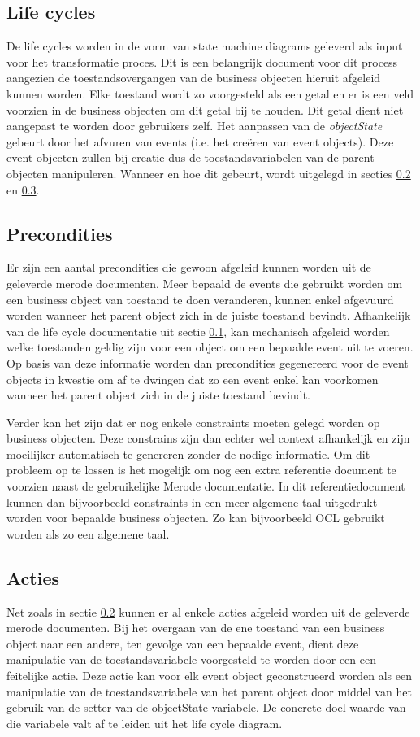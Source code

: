 \subsection{Life cycles}
\label{sec:Life_cycles}
De life cycles worden in de vorm van state machine diagrams geleverd als input voor het transformatie proces. 
Dit is een belangrijk document voor dit process aangezien de toestandsovergangen van de business objecten hieruit afgeleid kunnen worden.
Elke toestand wordt zo voorgesteld als een getal en er is een veld voorzien in de business objecten om dit getal bij te houden. 
Dit getal dient niet aangepast te worden door gebruikers zelf. Het aanpassen van de \textit{objectState} gebeurt door het afvuren van events (i.e. het cre\"eren van event objects). 
Deze event objecten zullen bij creatie dus de toestandsvariabelen van de parent objecten manipuleren.
Wanneer en hoe dit gebeurt, wordt uitgelegd in secties \ref{sec:precondities} en \ref{sec:acties}.
\subsection{Precondities}
\label{sec:precondities}
Er zijn een aantal precondities die gewoon afgeleid kunnen worden uit de geleverde merode documenten.
Meer bepaald de events die gebruikt worden om een business object van toestand te doen veranderen, kunnen enkel afgevuurd worden wanneer het parent object zich in de juiste toestand bevindt. 
Afhankelijk van de life cycle documentatie uit sectie \ref{sec:Life_cycles}, kan mechanisch afgeleid worden welke toestanden geldig zijn voor een object om een bepaalde event uit te voeren.
Op basis van deze informatie worden dan precondities gegenereerd voor de event objects in kwestie om af te dwingen dat zo een event enkel kan voorkomen wanneer het parent object zich in de juiste toestand bevindt. 

Verder kan het zijn dat er nog enkele constraints moeten gelegd worden op business objecten. Deze constrains zijn dan echter wel context afhankelijk en zijn moeilijker automatisch te genereren zonder de nodige informatie.
Om dit probleem op te lossen is het mogelijk om nog een extra referentie document te voorzien naast de gebruikelijke Merode documentatie.
In dit referentiedocument kunnen dan bijvoorbeeld constraints in een meer algemene taal uitgedrukt worden voor bepaalde business objecten. Zo kan bijvoorbeeld OCL gebruikt worden als zo een algemene taal.

\subsection{Acties}
\label{sec:acties}
Net zoals in sectie \ref{sec:precondities} kunnen er al enkele acties afgeleid worden uit de geleverde merode documenten.
Bij het overgaan van de ene toestand van een business object naar een andere, ten gevolge van een bepaalde event, dient deze manipulatie van de toestandsvariabele voorgesteld te worden door een een feitelijke actie. 
Deze actie kan voor elk event object geconstrueerd worden als een manipulatie van de toestandsvariabele van het parent object door middel van het gebruik van de setter van de objectState variabele. 
De concrete doel waarde van die variabele valt af te leiden uit het life cycle diagram.

